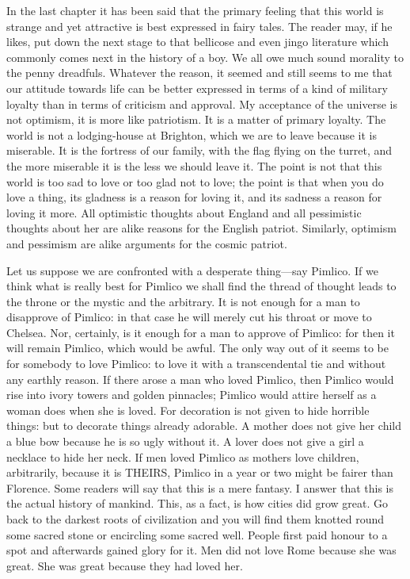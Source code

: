 In the last chapter it has been said that the primary feeling that this world is strange and yet attractive is best expressed in fairy tales. The reader may, if he likes, put down the next stage to that bellicose and even jingo literature which commonly comes next in the history of a boy. We all owe much sound morality to the penny dreadfuls. Whatever the reason, it seemed and still seems to me that our attitude towards life can be better expressed in terms of a kind of military loyalty than in terms of criticism and approval. My acceptance of the universe is not optimism, it is more like patriotism. It is a matter of primary loyalty. The world is not a lodging-house at Brighton, which we are to leave because it is miserable. It is the fortress of our family, with the flag flying on the turret, and the more miserable it is the less we should leave it. The point is not that this world is too sad to love or too glad not to love; the point is that when you do love a thing, its gladness is a reason for loving it, and its sadness a reason for loving it more. All optimistic thoughts about England and all pessimistic thoughts about her are alike reasons for the English patriot. Similarly, optimism and pessimism are alike arguments for the cosmic patriot.

Let us suppose we are confronted with a desperate thing—say Pimlico. If we think what is really best for Pimlico we shall find the thread of thought leads to the throne or the mystic and the arbitrary. It is not enough for a man to disapprove of Pimlico: in that case he will merely cut his throat or move to Chelsea. Nor, certainly, is it enough for a man to approve of Pimlico: for then it will remain Pimlico, which would be awful. The only way out of it seems to be for somebody to love Pimlico: to love it with a transcendental tie and without any earthly reason. If there arose a man who loved Pimlico, then Pimlico would rise into ivory towers and golden pinnacles; Pimlico would attire herself as a woman does when she is loved. For decoration is not given to hide horrible things: but to decorate things already adorable. A mother does not give her child a blue bow because he is so ugly without it. A lover does not give a girl a necklace to hide her neck. If men loved Pimlico as mothers love children, arbitrarily, because it is THEIRS, Pimlico in a year or two might be fairer than Florence. Some readers will say that this is a mere fantasy. I answer that this is the actual history of mankind. This, as a fact, is how cities did grow great. Go back to the darkest roots of civilization and you will find them knotted round some sacred stone or encircling some sacred well. People first paid honour to a spot and afterwards gained glory for it. Men did not love Rome because she was great. She was great because they had loved her.

